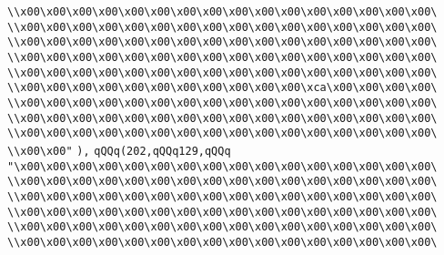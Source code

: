 \verb|\\x00\x00\x00\x00\x00\x00\x00\x00\x00\x00\x00\x00\x00\x00\x00\x00\|\newline
\verb|\\x00\x00\x00\x00\x00\x00\x00\x00\x00\x00\x00\x00\x00\x00\x00\x00\|\newline
\verb|\\x00\x00\x00\x00\x00\x00\x00\x00\x00\x00\x00\x00\x00\x00\x00\x00\|\newline
\verb|\\x00\x00\x00\x00\x00\x00\x00\x00\x00\x00\x00\x00\x00\x00\x00\x00\|\newline
\verb|\\x00\x00\x00\x00\x00\x00\x00\x00\x00\x00\x00\x00\x00\x00\x00\x00\|\newline
\verb|\\x00\x00\x00\x00\x00\x00\x00\x00\x00\x00\x00\xca\x00\x00\x00\x00\|\newline
\verb|\\x00\x00\x00\x00\x00\x00\x00\x00\x00\x00\x00\x00\x00\x00\x00\x00\|\newline
\verb|\\x00\x00\x00\x00\x00\x00\x00\x00\x00\x00\x00\x00\x00\x00\x00\x00\|\newline
\verb|\\x00\x00\x00\x00\x00\x00\x00\x00\x00\x00\x00\x00\x00\x00\x00\x00\|\newline
\verb|\\x00\x00"|\newline
\verb|),|\newline
\verb|qQQq(202,qQQq129,qQQq|\newline
\verb|"\x00\x00\x00\x00\x00\x00\x00\x00\x00\x00\x00\x00\x00\x00\x00\x00\|\newline
\verb|\\x00\x00\x00\x00\x00\x00\x00\x00\x00\x00\x00\x00\x00\x00\x00\x00\|\newline
\verb|\\x00\x00\x00\x00\x00\x00\x00\x00\x00\x00\x00\x00\x00\x00\x00\x00\|\newline
\verb|\\x00\x00\x00\x00\x00\x00\x00\x00\x00\x00\x00\x00\x00\x00\x00\x00\|\newline
\verb|\\x00\x00\x00\x00\x00\x00\x00\x00\x00\x00\x00\x00\x00\x00\x00\x00\|\newline
\verb|\\x00\x00\x00\x00\x00\x00\x00\x00\x00\x00\x00\x00\x00\x00\x00\x00\|\newline
